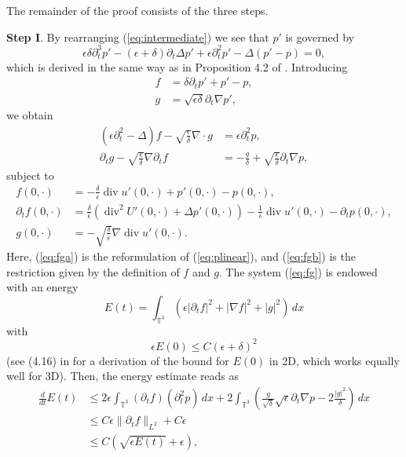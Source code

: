 \documentclass[reqno,10pt]{amsart}
\theoremstyle{definition}
\theoremstyle{remark}
\numberwithin{equation}{section}
\DeclareMathOperator{\dive}{div}
\begin{document}
The remainder of the proof consists of the three steps.

\textbf{Step I}. 
By rearranging (\ref{eq:intermediate}) we see that $p'$ is governed by
\begin{equation} \label{eq:plinear}
    \epsilon\delta\partial_t^3 p' - (\epsilon+\delta)\partial_t \Delta p' + \epsilon \partial_t^2 p' - \Delta (p'-p) = 0,
\end{equation}
which is derived in the same way as in  Proposition 4.2 of \cite{HRYZ25}. Introducing
\begin{subequations}
\begin{align}
    f &= \delta \partial_t p' + p'-p, \label{eq:fdef} \\
    g &=\sqrt{\epsilon\delta}\partial_t\nabla p',
\end{align}
\end{subequations}
we obtain
\begin{subequations} \label{eq:fg}
    \begin{align}
        (\epsilon\partial_t^2-\Delta)f - \sqrt{\frac{\epsilon}{\delta}} \nabla\cdot g &= \epsilon \partial_t^2 p, \label{eq:fga} \\
        \partial_t g - \sqrt{\frac{\epsilon}{\delta}} \nabla \partial_t f &= -\frac{g}{\delta} + \sqrt{\frac{\epsilon}{\delta}} \partial_t \nabla p, \label{eq:fgb}
    \end{align}
\end{subequations}
subject to
\[
\begin{aligned}
    f(0,\cdot) &= -\frac{\delta}{\epsilon}\dive u'(0,\cdot) + p'(0,\cdot)-p(0,\cdot), \\
    \partial_t f(0,\cdot) &= \frac{\delta}{\epsilon}\left( \dive^2 U'(0,\cdot) + \Delta p'(0,\cdot) \right) - \frac{1}{\epsilon}\dive u'(0,\cdot) - \partial_tp(0,\cdot), \\
    g(0,\cdot)&= -\sqrt{\frac{\delta}{\epsilon}} \nabla\dive u'(0,\cdot).
\end{aligned}
\]
Here, (\ref{eq:fga}) is the reformulation of (\ref{eq:plinear}), and (\ref{eq:fgb}) is the restriction given by the definition of $f$ and $g$. The system (\ref{eq:fg}) is endowed with an energy
\[
    E(t)=\int_{\mathbb T^3} \left( \epsilon |\partial_t f|^2 + |\nabla f|^2 + |g|^2 \right)\, dx
\]
with
\[ \epsilon E(0) \le C(\epsilon+\delta)^2 \]
(see (4.16) in \cite{HRYZ25} for a derivation of the bound for $E(0)$ in 2D, which works equally well for 3D). Then, the energy estimate reads as
\[
\begin{aligned}
    \frac{d}{dt}E(t) &\le 2\epsilon\int_{\mathbb T^3} (\partial_t f) (\partial_t^2p) \, dx + 2\int_{\mathbb T^3} \left( \frac{g}{\sqrt\delta} \sqrt\epsilon \partial_t\nabla p - 2\frac{|g|^2}{\delta} \right) \, dx\\
    &\le C \epsilon \|\partial_t f\|_{L^2} + C\epsilon \\
    &\le C\left( \sqrt{\epsilon E(t)} + \epsilon \right),
\end{aligned}
\]
\end{document}
